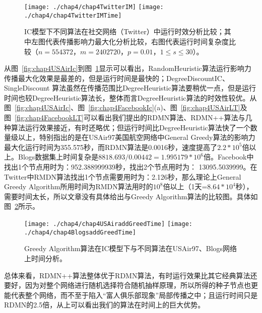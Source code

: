 \begin{figure}[H]
	\centering%
	\subcaptionbox{\label{fig:chap4TwitterIM}}
	{\texttt{[image: ./chap4/chap4TwitterIM]}}
	\subcaptionbox{\label{fig:chap4TwitterIMTime}}
	{\texttt{[image: ./chap4/chap4TwitterIMTime]}}
	\caption{IC模型下不同算法在社交网络（Twitter）中运行时效分析比较；其中左图代表传播影响力最大化分析比较，右图代表运行时间复杂度比较（$n=554372$，$m=2402720$，$p=0.01$，$1\le s\leq 30$）。}
	\label{fig:chap4TwitterIc}
\end{figure}
从图~\ref{fig:chap4USAirIc}到图~\ref{fig:chap4TwitterIc}显示可以看出，RandomHeuristic算法运行影响力传播最大化效果是最差的，但是运行时间是最快的；DegreeDiscountIC、SingleDiscount 算法虽然在传播范围比DegreeHeuristic算法要稍优一点，但是运行时间也较DegreeHeuristic算法长，整体而言DegreeHeuristic算法的时效性较优。从图~\ref{fig:chap4USAirIc}、图~\ref{fig:chap4FacebookIc}(a)、图~\ref{fig:chap4USAirLT}及图~\ref{fig:chap4FacebookLT}可以看出我们提出的RDMN算法、RDMN++算法与几种算法运行效果接近，有时还略优；但运行时间比DegreeHeuristic算法快了一个数量级以上，特别指出的是在USAir97美国航空网络中General Greedy算法的影响力最大化运行时间为355.575秒，而RDMN算法是0.0016秒，速度提高了$2.2*10^5$倍以上。Blogs数据集上时间复杂是$8818.693/0.00442=1.995179*10^6$倍。Facebook中找出1个节点用时为：952.388999939秒，找出2个节点用时为： 13095.5039999。在Twitter中RMDN算法找出1个节点需要用时为：2.126秒，那么理论上General Greedy Algorithm所用时间为RMDN算法用时的$10^8$倍以上（1天=$8.64*10^4$秒），需要时间太长，所以文章没有具体给出与Greedy Algorithm算法的比较图。具体如图~\ref{fig:chap4addGreedTime}所示。
\begin{figure}[H]
	\centering%
	\subcaptionbox{\label{fig:chap4USAiraddGreedTime}}
	{\texttt{[image: ./chap4/chap4USAiraddGreedTime]}}
	\subcaptionbox{\label{fig:chap4BlogsaddGreedTime}}
	{\texttt{[image: ./chap4/chap4BlogsaddGreedTime]}}
	\caption{Greedy Algorithm算法在IC模型下与不同算法在USAir97、Blogs网络上时间分析。}
	\label{fig:chap4addGreedTime}
\end{figure}
总体来看，RDMN++算法整体优于RDMN算法，有时运行效果比其它经典算法还要好，因为对整个网络进行随机选择符合随机抽样原理，所以所得的种子节点也更能代表整个网络，而不至于陷入“富人俱乐部现象”局部传播之中；且运行时间只是RDMN的2.5倍，从上可以看出我们的算法在时间上的巨大优势。

